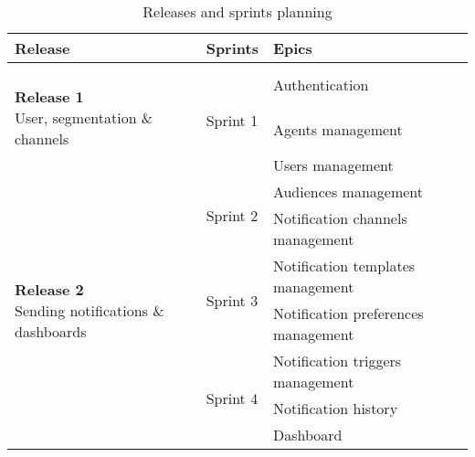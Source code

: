 \begin{table}[hbt!]
      \begin{tabular}{ | m{} | m{} | m{} | }
            \hline
            \textbf{Release}                                                                             & \textbf{Sprints}            & \textbf{Epics}                      \\
            \hline
            \multirow{2}{9em}{\newline \textbf{Release 1} \newline  User, segmentation \& channels}
                                                                                                         & \multirow{3}{5em}{Sprint 1} & Authentication                      \\
            \cline{3-3}
                                                                                                         &                             & Agents management                   \\
            \cline{3-3}
                                                                                                         &                             & Users management                    \\
            \cline{2-3}

                                                                                                         & \multirow{2}{5em}{Sprint 2} & Audiences management                \\
            \cline{3-3}
                                                                                                         &                             & Notification channels management    \\
            \hline
            \multirow{2}{10em}{\newline \textbf{Release 2} \newline Sending notifications \& dashboards} & \multirow{2}{5em}{Sprint 3} & Notification templates management   \\
            \cline{3-3}
                                                                                                         &                             & Notification preferences management \\
            \cline{2-3}
                                                                                                         & \multirow{3}{5em}{Sprint 4} & Notification triggers management    \\
            \cline{3-3}
                                                                                                         &                             & Notification history                \\
            \cline{3-3}
                                                                                                         &                             & Dashboard                           \\
            \hline
      \end{tabular}
      \caption{Releases and sprints planning}
      \label{tab:planning}
\end{table}


